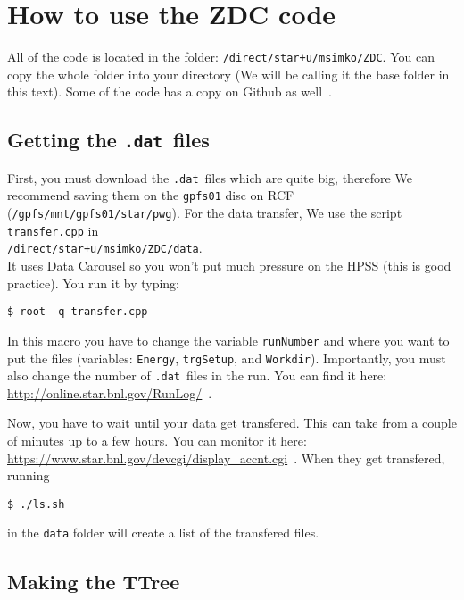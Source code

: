 \section{How to use the ZDC code}\hypertarget{how-to-use-the-zdc-code}{}\label{how-to-use-the-zdc-code}

All of the code is located in the folder: \texttt{/direct/star+u/msimko/ZDC}. You can copy the whole folder into
your directory (We will be calling it the base folder in this text). Some of the code has
a copy on Github as well~\cite{ZdcGithubRepo}.

\subsection{Getting the \texttt{.dat}\ files}\hypertarget{getting-the-dat-files}{}\label{getting-the-dat-files}

First, you must download the \verb=.dat=\ files which are quite big, therefore We recommend saving them on
the \texttt{gpfs01} disc on RCF (\texttt{/gpfs/mnt/gpfs01/star/pwg}). For the data transfer, We use the script
\texttt{transfer.cpp} in\\
\texttt{/direct/star+u/msimko/ZDC/data}.\\
It uses Data Carousel so you won't put much
pressure on the HPSS (this is good practice). You run it by typing:
\begin{verbatim}
$ root -q transfer.cpp
\end{verbatim}
In this macro you have to change the variable
\texttt{runNumber} and where you want to put the files (variables: \texttt{Energy}, \texttt{trgSetup}, 
and \texttt{Workdir}).
Importantly, you must also change the number of \verb=.dat=\ files in the run. You can find it here:
\url{http://online.star.bnl.gov/RunLog/}~\cite{runLogBrowser}.

Now, you have to wait until your data get transfered. This can take from a couple of minutes up to a few hours.
You can monitor it here:
\url{https://www.star.bnl.gov/devcgi/display_accnt.cgi}~\cite{hpss}.
When they get transfered, running
\begin{verbatim}
$ ./ls.sh
\end{verbatim}
in the \texttt{data} folder will create a list of the transfered files.

\subsection{Making the TTree}\hypertarget{making-the-ttree}{}\label{making-the-ttree}

